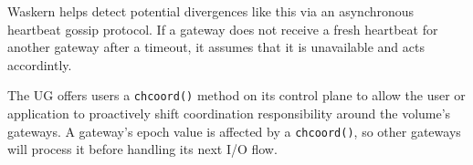 Waskern helps detect potential divergences like this via an asynchronous heartbeat
gossip protocol.  If a gateway does not receive a fresh heartbeat for another gateway after
a timeout, it assumes that it is unavailable and acts accordintly.

The UG offers users a
\texttt{chcoord()} method on its control plane to allow the user or application
to proactively shift coordination responsibility around the volume's
gateways.  A gateway's epoch value is affected by a \texttt{chcoord()}, so other
gateways will process it before handling its next I/O flow.

